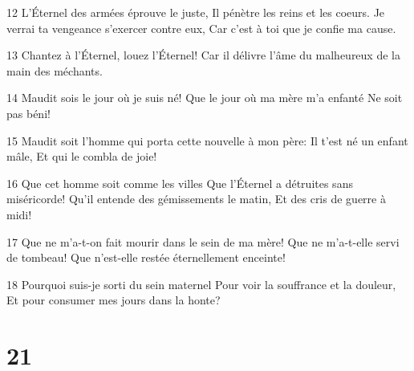 \par 12 L'Éternel des armées éprouve le juste, Il pénètre les reins et les coeurs. Je verrai ta vengeance s'exercer contre eux, Car c'est à toi que je confie ma cause.
\par 13 Chantez à l'Éternel, louez l'Éternel! Car il délivre l'âme du malheureux de la main des méchants.
\par 14 Maudit sois le jour où je suis né! Que le jour où ma mère m'a enfanté Ne soit pas béni!
\par 15 Maudit soit l'homme qui porta cette nouvelle à mon père: Il t'est né un enfant mâle, Et qui le combla de joie!
\par 16 Que cet homme soit comme les villes Que l'Éternel a détruites sans miséricorde! Qu'il entende des gémissements le matin, Et des cris de guerre à midi!
\par 17 Que ne m'a-t-on fait mourir dans le sein de ma mère! Que ne m'a-t-elle servi de tombeau! Que n'est-elle restée éternellement enceinte!
\par 18 Pourquoi suis-je sorti du sein maternel Pour voir la souffrance et la douleur, Et pour consumer mes jours dans la honte?

\chapter{21}

